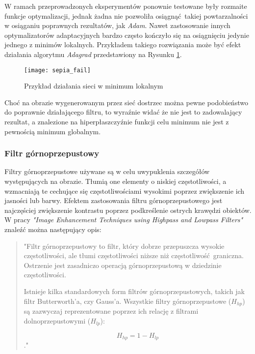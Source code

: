     W ramach przeprowadzonych eksperymentów ponownie testowane były rozmaite funkcje
    optymalizacji, jednak żadna nie pozwoliła osiągnąć takiej powtarzalności w osiąganiu
    poprawnych rezultatów, jak \textit{Adam}. Nawet zastosowanie innych optymalizatorów
    adaptacyjnych bardzo często kończyło się na osiągnięciu jedynie jednego z minimów
    lokalnych. Przykładem takiego rozwiązania może być efekt działania algorytmu
    \textit{Adagrad} przedstawiony na Rysunku \ref{fig:sepia_fail}.

    \begin{figure}[H]
      \centering
      \texttt{[image: sepia\_fail]}
      \caption[Przykład działania sieci w minimum lokalnym - źródło: Praca własna]{Przykład działania sieci w minimum lokalnym}
      \label{fig:sepia_fail}
    \end{figure}

    Choć na obrazie wygenerowanym przez sieć dostrzec można pewne podobieństwo do
    poprawnie działającego filtru, to wyraźnie widać że nie jest to zadowalający
    rezultat, a znalezione na hiperpłaszczyźnie funkcji celu minimum nie jest z pewnością
    minimum globalnym.

  \subsubsection{Filtr górnoprzepustowy}

    Filtry górnoprzepustowe używane są w celu uwypuklenia szczegółów występujących na
    obrazie. Tłumią one elementy o niskiej częstotliwości, a wzmacniają te cechujące
    się częstotliwościami wysokimi poprzez zwiększenie ich jasności lub barwy.
    Efektem zastosowania filtru górnoprzepustowego jest najczęściej zwiększenie
    kontrastu poprzez podkreślenie ostrych krawędzi obiektów. W pracy
    \textit{"Image Enhancement Techniques using Highpass and
    Lowpass Filters"} \cite{highpass_filter} znaleźć można następujący opis:

    \begin{quote}
      "Filtr górnoprzepustowy to filtr, który dobrze przepuszcza wysokie częstotliwości,
      ale tłumi częstotliwości niższe niż częstotliwość graniczna. Ostrzenie jest
      zasadniczo operacją górnoprzepustową w dziedzinie częstotliwości.

      Istnieje kilka standardowych form filtrów górnoprzepustowych, takich jak
      filtr Butterworth'a, czy Gauss'a. Wszystkie filtry górnoprzepustowe ($H_{hp}$) są
      zazwyczaj reprezentowane poprzez ich relację z filtrami dolnoprzepustowymi ($H_{lp}$):

      \[H_{hp} = 1 - H_{lp}\]."
    \end{quote}


